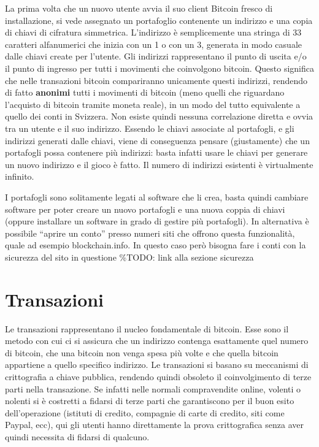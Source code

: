 La prima volta che un nuovo utente avvia il suo client Bitcoin fresco di
installazione, si vede assegnato un portafoglio contenente un indirizzo
e una copia di chiavi di cifratura simmetrica. L'indirizzo è
semplicemente una stringa di 33 caratteri alfanumerici che inizia con un
1 o con un 3, generata in modo casuale dalle chiavi create per l'utente.
Gli indirizzi rappresentano il punto di uscita e/o il punto di ingresso
per tutti i movimenti che coinvolgono bitcoin. Questo significa che
nelle transazioni bitcoin compariranno unicamente questi indirizzi,
rendendo di fatto \textbf{anonimi} tutti i movimenti di bitcoin (meno
quelli che riguardano l'acquisto di bitcoin tramite moneta reale), in un
modo del tutto equivalente a quello dei conti in Svizzera. Non esiste
quindi nessuna correlazione diretta e ovvia tra un utente e il suo
indirizzo. Essendo le chiavi associate al portafogli, e gli indirizzi
generati dalle chiavi, viene di conseguenza pensare (giustamente) che un
portafogli possa contenere più indirizzi: basta infatti usare le chiavi
per generare un nuovo indirizzo e il gioco è fatto. Il numero di
indirizzi esistenti è virtualmente infinito.

I portafogli sono solitamente legati al software che li crea, basta
quindi cambiare software per poter creare un nuovo portafogli e una
nuova coppia di chiavi (oppure installare un software in grado di
gestire più portafogli). In alternativa è possibile ``aprire un conto''
presso numeri siti che offrono questa funzionalità, quale ad esempio
blockchain.info. In questo caso però bisogna fare i conti con la
sicurezza del sito in questione \%TODO: link alla sezione sicurezza

\section{Transazioni}\label{transazioni}

Le transazioni rappresentano il nucleo fondamentale di bitcoin. Esse
sono il metodo con cui ci si assicura che un indirizzo contenga
esattamente quel numero di bitcoin, che una bitcoin non venga spesa più
volte e che quella bitcoin appartiene a quello specifico indirizzo. Le
transazioni si basano su meccanismi di crittografia a chiave pubblica,
rendendo quindi obsoleto il coinvolgimento di terze parti nella
transazione. Se infatti nelle normali compravendite online, volenti o
nolenti si è costretti a fidarsi di terze parti che garantiscono per il
buon esito dell'operazione (istituti di credito, compagnie di carte di
credito, siti come Paypal, ecc), qui gli utenti hanno direttamente la
prova crittografica senza aver quindi necessita di fidarsi di qualcuno.

